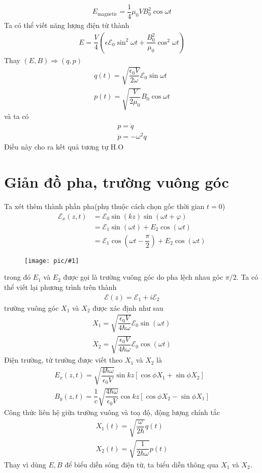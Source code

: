 \documentclass{report}
\newcommand{\image}[1]{
\begin{figure}[H]
	\centering
	\texttt{[image: pic/\#1]}
	\label{#1}
\end{figure}
}
\newcommand{\f}[2]{\dfrac{#1}{#2}}
\begin{document}
\begin{gather}
	E_{\text{magnetic}} = \f{1}{4} \mu_{0} V B_{0}^{2} \cos \omega t
\end{gather}
Ta có thể viết năng lượng điện từ thành
\begin{gather}
	E = \f{V}{4} (\epsilon \mathcal{E}_{0} \sin^{2} \omega t + \f{ B_{0}^{2} }{ \mu_{0} } \cos^{2} \omega t )
\end{gather}
Thay $(E,B) \Rightarrow (q,p)$
\begin{gather}
	q(t) = \sqrt{\f{\epsilon_{0} V}{2\omega}} \mathcal{E}_{0} \sin \omega t\\
	p(t) = \sqrt{\f{V}{2 \mu_{0} }} B_{0} \cos \omega t
\end{gather}
và ta có
\begin{gather}
	p = \dot{q}\\
	\dot{p} = - \omega^{2} q
\end{gather}
Điều này cho ra kết quả tương tự H.O
\section{Giản đồ pha, trường vuông góc}
Ta xét thêm thành phần pha(phụ thuộc cách chọn gốc thời gian $t=0$)
\begin{equation}
	\begin{aligned}
		\mathcal{E}_{x}(z,t)
		&= \mathcal{E}_{0} \sin(kz) \sin(\omega t + \varphi)\\
		&= \mathcal{E}_{1} \sin(\omega t) + E_{2} \cos(\omega t)\\
		&= \mathcal{E}_{1} \cos(\omega t - \f{\pi}{2}) + E_{2} \cos(\omega t)
	\end{aligned}
\end{equation}
\image{phaseDiag.png}
trong đó $E_{1}$ và $E_{2}$ được gọi là trường vuông góc do pha lệch nhau góc $\pi / 2$. Ta có thể viết lại phương trình trên thành 
\begin{gather}
	\mathcal{E}(z) = \mathcal{E}_{1} + i \mathcal{E}_{2}
\end{gather}
trường vuông góc $X_{1}$ và $X_{2}$ được xác định như sau
\begin{gather}
	X_{1} = \sqrt{\f{\epsilon_{0} V}{4 \hbar \omega}} \mathcal{E}_{0} \sin (\omega t)\\
	X_{2} = \sqrt{\f{\epsilon_{0} V}{4 \hbar \omega}} \mathcal{E}_{0} \cos (\omega t)
\end{gather}
Điện trường, từ trường được viết theo $X_{1}$ và $X_{2}$ là
\begin{gather}
	E_{x}(z, t) = \sqrt{\f{4 \hbar \omega}{\epsilon_{0} V}} \sin kz \left[ \cos \phi X_{1} + \sin \phi X_{2} \right]\\
	B_{y}(z, t) = \f{1}{c} \sqrt{\f{4 \hbar \omega}{\epsilon_{0} V}} \cos kz \left[ \cos \phi X_{2} - \sin \phi X_{1} \right]
\end{gather}
Công thức liên hệ giữa trường vuông và toạ độ, động lượng chính tắc
\begin{gather}
	X_{1}(t) = \sqrt{\f{\omega}{2 \hbar}} q(t)\\
	X_{2}(t) = \sqrt{\f{1}{2\hbar \omega}}p(t)
\end{gather}
Thay vì dùng $E,B$ để biểu diễn sóng điện từ, ta biểu diễn thông qua $X_{1}$ và $X_{2}$.
\end{document}
